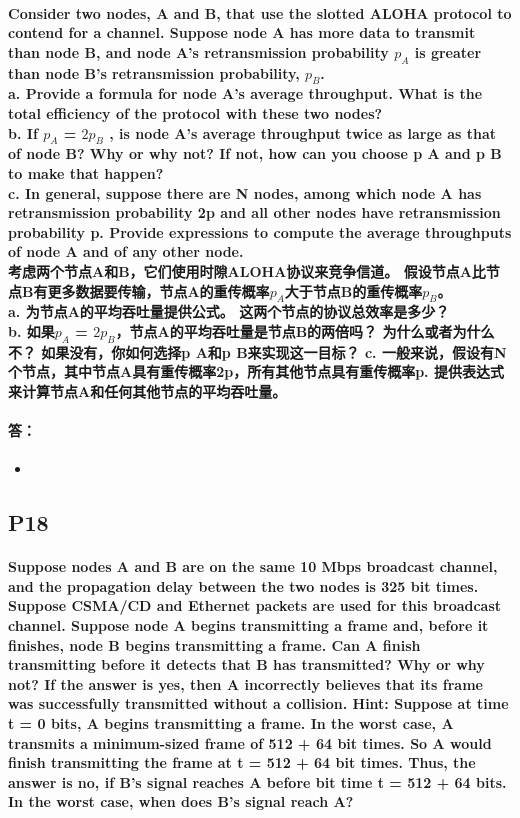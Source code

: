 \documentclass[a4paper]{ctexart}
\begin{document}
\paragraph*{Consider two nodes, A and B, that use the slotted ALOHA protocol to contend for a channel. Suppose node A has more data to transmit than node B, and node A’s retransmission probability $p_A$ is greater than node B’s retransmission probability, $p_B$.\\
a. Provide a formula for node A’s average throughput. What is the total efficiency of the protocol with these two nodes?\\
b. If $p_A$ = $2p_B$ , is node A’s average throughput twice as large as that of node B? Why or why not? If not, how can you choose p A and p B to make that happen?\\
c. In general, suppose there are N nodes, among which node A has retransmission probability 2p and all other nodes have retransmission probability p. Provide expressions to compute the average throughputs of node A and of any other node.\\
考虑两个节点A和B，它们使用时隙ALOHA协议来竞争信道。 假设节点A比节点B有更多数据要传输，节点A的重传概率$ p_A $大于节点B的重传概率$ p_B $。\\
a. 为节点A的平均吞吐量提供公式。 这两个节点的协议总效率是多少？\\
b. 如果$ p_A $ = $ 2p_B $，节点A的平均吞吐量是节点B的两倍吗？ 为什么或者为什么不？ 如果没有，你如何选择p A和p B来实现这一目标？
c. 一般来说，假设有N个节点，其中节点A具有重传概率2p，所有其他节点具有重传概率p. 提供表达式来计算节点A和任何其他节点的平均吞吐量。}
\paragraph*{答：} 
\begin{itemize}
    \item 
\end{itemize}

\subsection*{P18}
\paragraph*{Suppose nodes A and B are on the same 10 Mbps broadcast channel, and the propagation delay between the two nodes is 325 bit times. Suppose CSMA/CD and Ethernet packets are used for this broadcast channel. Suppose node A begins transmitting a frame and, before it finishes, node B begins transmitting a frame. Can A finish transmitting before it detects that B has transmitted? Why or why not? If the answer is yes, then A incorrectly believes that its frame was successfully transmitted without a collision. Hint: Suppose at time t = 0 bits, A begins transmitting a frame. In the worst case, A transmits a minimum-sized frame of 512 + 64 bit times. So A would finish transmitting the frame at t = 512 + 64 bit times. Thus, the answer is no, if B’s signal reaches A before bit time t = 512 + 64 bits. In the worst case, when does B’s signal reach A?\\}
\end{document}
